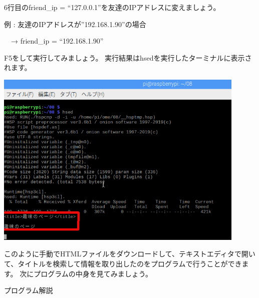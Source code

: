 \bigskip

\clearpage
6行目のfriend\_ip =
“127.0.0.1”を友達のIPアドレスに変えましょう。


例 : 友達のIPアドレスが”192.168.1.90”の場合

\ \ → friend\_ip = “192.168.1.90”

F5をして実行してみましょう。
実行結果はhsedを実行したターミナルに表示されます。



\begin{center}
\includegraphics[width=0.9\textwidth]{./text08-img/textbook-img015.png}

\end{center}


\bigskip


\bigskip

このように手動でHTMLファイルをダウンロードして、テキストエディタで開いて、タイトルを検索して情報を取り出したのをプログラムで行うことができます。
次にプログラムの中身を見てみましょう。

\clearpage
プログラム解説



